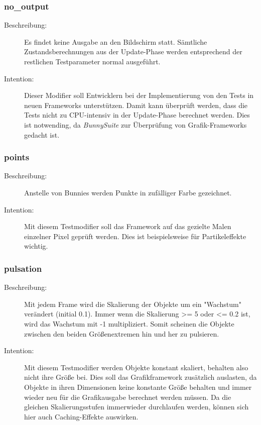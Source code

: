 \subsubsection{no\_output}
\begin{description}
\item[Beschreibung:] Es findet keine Ausgabe an den Bildschirm statt. Sämtliche Zustandsberechnungen aus der Update-Phase werden entsprechend der restlichen Testparameter normal ausgeführt. \\
\item[Intention:] Dieser Modifier soll Entwicklern bei der Implementierung von den Tests in neuen Frameworks unterstützen. Damit kann überprüft werden, dass die Tests nicht zu CPU-intensiv in der Update-Phase berechnet werden. Dies ist notwending, da \textit{BunnySuite} zur Überprüfung von Grafik-Frameworks gedacht ist.
\end{description}

\subsubsection{points}
\begin{description}
\item[Beschreibung:] Anstelle von Bunnies werden Punkte in zufälliger Farbe gezeichnet. \\
\item[Intention:] Mit diesem Testmodifier soll das Framework auf das gezielte Malen einzelner Pixel geprüft werden. Dies ist beispielsweise für Partikeleffekte wichtig.
\end{description}

\subsubsection{pulsation}
\begin{description}
\item[Beschreibung:] Mit jedem Frame wird die Skalierung der Objekte um ein "Wachstum" verändert (initial 0.1). Immer wenn die Skalierung \textgreater= 5 oder \textless= 0.2 ist, wird das Wachstum mit -1 multipliziert. Somit scheinen die Objekte zwischen den beiden Größenextremen hin und her zu pulsieren. \\
\item[Intention:] Mit diesem Testmodifier werden Objekte konstant skaliert, behalten also nicht ihre Größe bei. Dies soll das Grafikframework zusätzlich auslasten, da Objekte in ihren Dimensionen keine konstante Größe behalten und immer wieder neu für die Grafikausgabe berechnet werden müssen. Da die gleichen Skalierungsstufen immerwieder durchlaufen werden, können sich hier auch Caching-Effekte auswirken.
\end{description}

